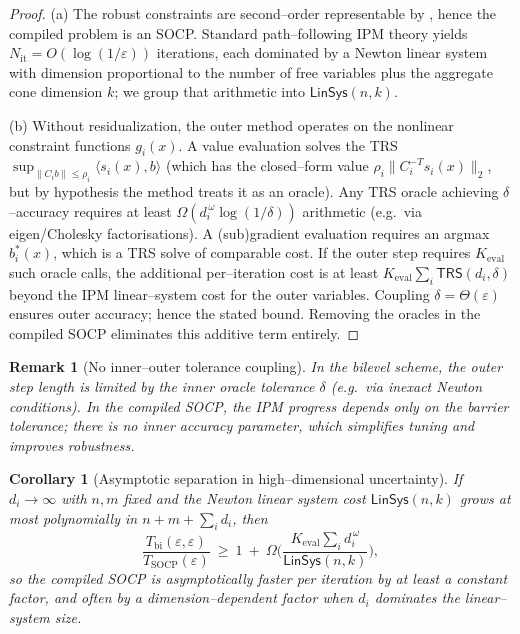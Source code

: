 \documentclass[11pt]{article}
\numberwithin{equation}{section}
\theoremstyle{upright}
\newtheorem{corollary}{Corollary}
\newtheorem{remark}{Remark}
\begin{document}
\begin{proof}
(a) The robust constraints are second–order representable by ,
hence the compiled problem is an SOCP. Standard path–following IPM theory
yields $N_{\mathrm{it}}=O(\log(1/\varepsilon))$ iterations, each dominated by a Newton
linear system with dimension proportional to the number of free variables plus the
aggregate cone dimension $k$; we group that arithmetic into $\mathsf{LinSys}(n,k)$.

(b) Without residualization, the outer method operates on the nonlinear constraint
functions $g_i(x)$. A value evaluation solves the TRS
\(
\sup_{\|C_i b\|\le\rho_i}\langle s_i(x),b\rangle
\)
(which has the closed–form value $\rho_i\|C_i^{-T}s_i(x)\|_2$, but by hypothesis the
method treats it as an oracle). Any TRS oracle achieving $\delta$–accuracy requires at least
$\Omega(d_i^{\,\omega}\log(1/\delta))$ arithmetic (e.g.\ via eigen/Cholesky factorisations).
A (sub)gradient evaluation requires an argmax $b_i^*(x)$, which is a TRS solve of comparable cost.
If the outer step requires $K_{\mathrm{eval}}$ such oracle calls, the additional per–iteration
cost is at least $K_{\mathrm{eval}}\sum_i \mathsf{TRS}(d_i,\delta)$ beyond the IPM
linear–system cost for the outer variables. Coupling $\delta=\Theta(\varepsilon)$ ensures
outer accuracy; hence the stated bound. Removing the oracles in the compiled SOCP eliminates
this additive term entirely.
\end{proof}

\begin{remark}[No inner–outer tolerance coupling]
In the bilevel scheme, the outer step length is limited by the inner oracle tolerance
$\delta$ (e.g.\ via inexact Newton conditions). In the compiled SOCP, the IPM progress
depends only on the barrier tolerance; there is no inner accuracy parameter, which
simplifies tuning and improves robustness.
\end{remark}

\begin{corollary}[Asymptotic separation in high–dimensional uncertainty]
If $d_i\to\infty$ with $n,m$ fixed and the Newton linear system cost
$\mathsf{LinSys}(n,k)$ grows at most polynomially in $n+m+\sum_i d_i$, then
\[
\frac{T_{\mathrm{bi}}(\varepsilon,\varepsilon)}{T_{\mathrm{SOCP}}(\varepsilon)}
\ \ge\ 1\ +\ \Omega\!\Big(\frac{K_{\mathrm{eval}}\sum_i d_i^{\,\omega}}{\mathsf{LinSys}(n,k)}\Big),
\]
so the compiled SOCP is asymptotically faster per iteration by at least a constant factor,
and often by a dimension–dependent factor when $d_i$ dominates the linear–system size.
\end{corollary}
\end{document}
